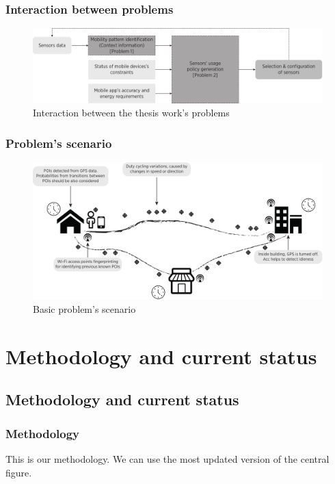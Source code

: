 \documentclass[compress,9pt,xcolor={dvipsnames,table}]{beamer}
\begin{document}
\begin{frame}\frametitle{Interaction between problems}
\begin{figure}[tb]
  \centering
  \includegraphics[width=\textwidth]{../../../resources/images/vectors/problems-incorporation}
  \caption{Interaction between the thesis work's problems}
  \label{fig:probems-incorporation}
\end{figure}
\end{frame}

\begin{frame}[t]\frametitle{Problem's scenario}
\begin{figure}[tb]
  \centering
  \includegraphics[width=\textwidth]{../../../resources/images/vectors/scenario}
  \caption{Basic problem's scenario}
  \label{fig:scenario}
\end{figure}
\end{frame}


\section{Methodology and current status} %
\subsection{Methodology and current status}
\begin{frame}[t]\frametitle{Methodology}
This is our methodology.
We can use the most updated version of the central figure.
\end{frame}
\end{document}
